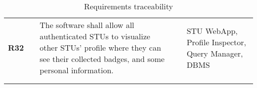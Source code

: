 \begin{longtable}[H]{l l p{6cm} l p{4cm}}
    \textbf{R32}            & \vline & The software shall allow all authenticated STUs to visualize other STUs' profile where they can see their collected badges, and some personal information.                                                                                                                   & \vline &  STU WebApp, Profile Inspector, Query Manager, DBMS                                      \\          
                            &        &                                                                                                                                                                                                                                                                              &        &                                                                                          \\
    \hline
    \caption{Requirements traceability}
\end{longtable}